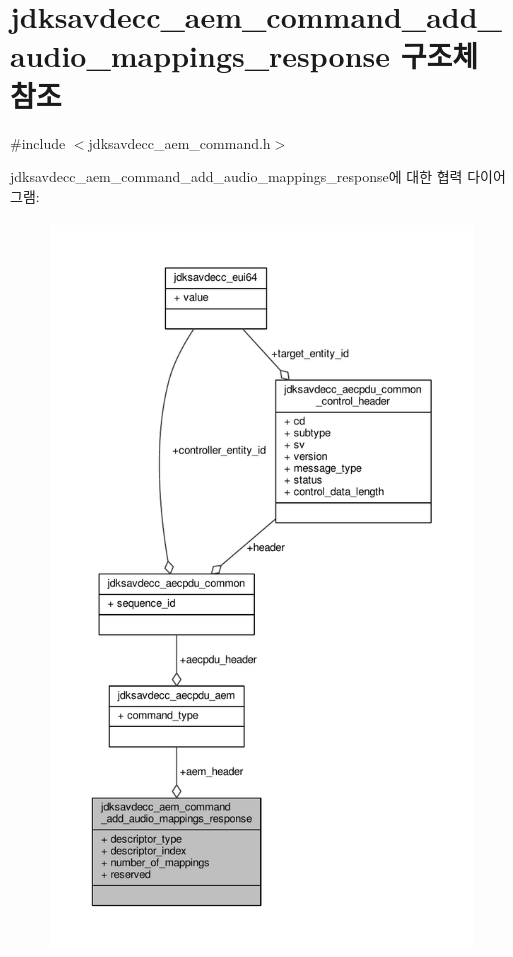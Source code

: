 \hypertarget{structjdksavdecc__aem__command__add__audio__mappings__response}{}\section{jdksavdecc\+\_\+aem\+\_\+command\+\_\+add\+\_\+audio\+\_\+mappings\+\_\+response 구조체 참조}
\label{structjdksavdecc__aem__command__add__audio__mappings__response}


{\ttfamily \#include $<$jdksavdecc\+\_\+aem\+\_\+command.\+h$>$}



jdksavdecc\+\_\+aem\+\_\+command\+\_\+add\+\_\+audio\+\_\+mappings\+\_\+response에 대한 협력 다이어그램\+:
\nopagebreak
\begin{figure}[H]
\begin{center}
\leavevmode
\includegraphics[height=550pt]{structjdksavdecc__aem__command__add__audio__mappings__response__coll__graph}
\end{center}
\end{figure}
